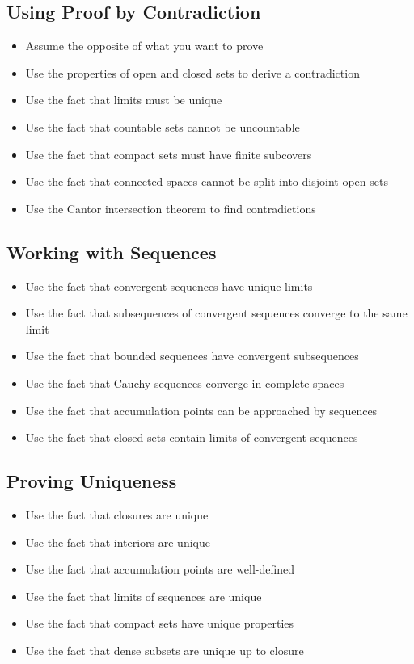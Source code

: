 \subsection*{Using Proof by Contradiction}
\begin{itemize}
\item Assume the opposite of what you want to prove
\item Use the properties of open and closed sets to derive a contradiction
\item Use the fact that limits must be unique
\item Use the fact that countable sets cannot be uncountable
\item Use the fact that compact sets must have finite subcovers
\item Use the fact that connected spaces cannot be split into disjoint open sets
\item Use the Cantor intersection theorem to find contradictions
\end{itemize}

\subsection*{Working with Sequences}
\begin{itemize}
\item Use the fact that convergent sequences have unique limits
\item Use the fact that subsequences of convergent sequences converge to the same limit
\item Use the fact that bounded sequences have convergent subsequences
\item Use the fact that Cauchy sequences converge in complete spaces
\item Use the fact that accumulation points can be approached by sequences
\item Use the fact that closed sets contain limits of convergent sequences
\end{itemize}

\subsection*{Proving Uniqueness}
\begin{itemize}
\item Use the fact that closures are unique
\item Use the fact that interiors are unique
\item Use the fact that accumulation points are well-defined
\item Use the fact that limits of sequences are unique
\item Use the fact that compact sets have unique properties
\item Use the fact that dense subsets are unique up to closure
\end{itemize}

